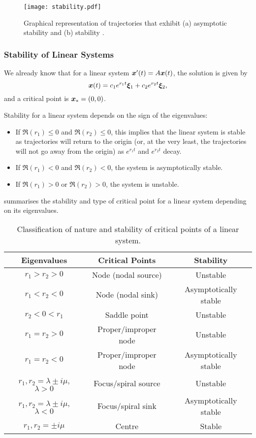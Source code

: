 \begin{figure}[!ht]
	\centering
	\texttt{[image: stability.pdf]}
	\caption{Graphical representation of trajectories that exhibit (a) asymptotic stability and (b) stability \cite[Figure 9.2.1]{boyce}.}
	\label{fig:stability}
\end{figure}

\subsubsection{Stability of Linear Systems}

We already know that for a linear system $\bm{x}'(t) = A\bm{x}(t)$, the solution is given by
\[
\bm{x}(t) = c_1e^{r_1t}\bm{\xi}_1 + c_2e^{r_2t}\bm{\xi}_2,
\]
and a critical point is $\bm{x}_{\ast} = (0,0)$.

Stability for a linear system depends on the sign of the eigenvalues:
\begin{itemize}
	\item If $\Re(r_1) \leq 0$ and $\Re(r_2) \leq 0$, this implies that the linear system is stable as trajectories will return to the origin (or, at the very least, the trajectories will not go away from the origin) as $e^{r_1t}$ and $e^{r_2t}$ decay.
	\item If $\Re(r_1)<0$ and $\Re(r_2)<0$, the system is asymptotically stable.
	\item If $\Re(r_1)>0$ or $\Re(r_2)>0$, the system is unstable.
\end{itemize}

 summarises the stability and type of critical point for a linear system depending on its eigenvalues.

\begin{table}[H]
	\begin{center}
		\begin{tabular}{c|c|c}
			Eigenvalues & Critical Points & Stability \\
			\hline
			$r_1 > r_2 > 0$ & Node (nodal source) & Unstable \\
			$r_1 < r_2 < 0$ & Node (nodal sink) & Asymptotically stable \\
			$r_2 < 0 < r_1$ & Saddle point & Unstable \\
			$r_1 = r_2 > 0$ & Proper/improper node & Unstable \\
			$r_1 = r_2 < 0$ & Proper/improper node & Asymptotically stable \\
			$r_1,r_2 = \lambda \pm i\mu$, $\lambda>0$ & Focus/spiral source & Unstable \\
			$r_1,r_2 = \lambda \pm i\mu$, $\lambda<0$ & Focus/spiral sink & Asymptotically stable \\
			$r_1,r_2 = \pm i\mu$ & Centre & Stable \\
		\end{tabular}
	\end{center}
	\caption{Classification of nature and stability of critical points of a linear system.}
	\label{table:stability}
\end{table}

